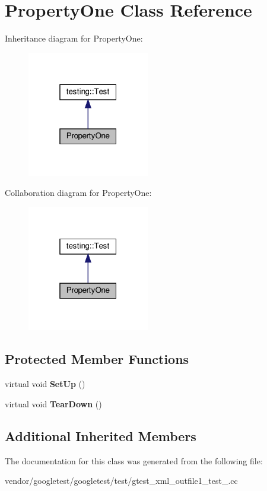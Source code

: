 \hypertarget{class_property_one}{}\section{Property\+One Class Reference}
\label{class_property_one}


Inheritance diagram for Property\+One\+:
\nopagebreak
\begin{figure}[H]
\begin{center}
\leavevmode
\includegraphics[width=151pt]{class_property_one__inherit__graph}
\end{center}
\end{figure}


Collaboration diagram for Property\+One\+:
\nopagebreak
\begin{figure}[H]
\begin{center}
\leavevmode
\includegraphics[width=151pt]{class_property_one__coll__graph}
\end{center}
\end{figure}
\subsection*{Protected Member Functions}
\begin{DoxyCompactItemize}
\item 
\mbox{\label{class_property_one_a9cb7d7cb508d5f1a6fc7cfead81ebc2b}} 
virtual void {\bfseries Set\+Up} ()
\item 
\mbox{\label{class_property_one_a3ed895113848403d5ea27f52a1bb0545}} 
virtual void {\bfseries Tear\+Down} ()
\end{DoxyCompactItemize}
\subsection*{Additional Inherited Members}


The documentation for this class was generated from the following file\+:\begin{DoxyCompactItemize}
\item 
vendor/googletest/googletest/test/gtest\+\_\+xml\+\_\+outfile1\+\_\+test\+\_\+.\+cc\end{DoxyCompactItemize}

